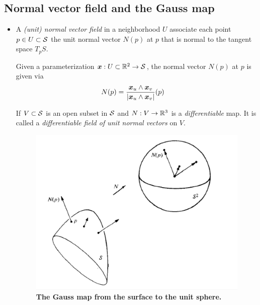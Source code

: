 \documentclass[11pt]{article}
\begin{document}
\subsection{Normal vector field and the Gauss map}
\begin{itemize}
\item  \begin{definition}
A \emph{(unit) normal vector field} in a neighborhood $U$ associate each point $p\in U\subset {\mathcal S}$ the unit normal vector $N(p)$ at $p$ that is normal to the tangent space $T_{p}S$.

Given a parameterization $\boldsymbol{x}: U\subset {\mathbb R}^{2} \rightarrow {\mathcal S}$, the normal vector $N(p)$ at $p$ is given via
\begin{align*}
N(p) &= \frac{\boldsymbol{x}_{u} \wedge \boldsymbol{x}_{v}}{\left\lvert \boldsymbol{x}_{u} \wedge \boldsymbol{x}_{v} \right\rvert}(p)
\end{align*}

If $V\subset {\mathcal S}$ is an open subset in ${\mathcal S}$ and $N: V\rightarrow {\mathbb R}^{3}$ is a \emph{differentiable} map. It is called a \emph{differentiable field of unit normal vectors} on $V$.

\begin{figure}[thb]
\centering
\begin{minipage}{0.5\linewidth}
 \centerline{\includegraphics[scale = 0.5]{gauss_map.png}}
\end{minipage}
\caption{\scriptsize
\textbf{The Gauss map from the surface to the unit sphere.}}
\end{figure}
 \end{definition} 


\end{itemize}
\end{document}
